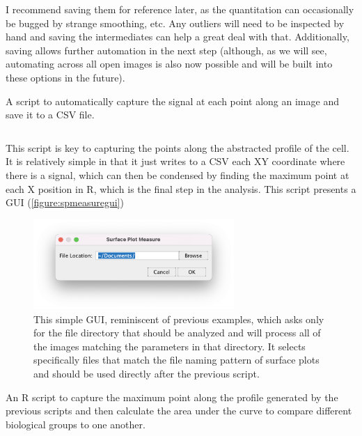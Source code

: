 I recommend saving them for reference later, as the quantitation can occasionally be bugged by strange smoothing, etc. Any outliers will need to be inspected by hand and saving the intermediates can help a great deal with that. Additionally, saving allows further automation in the next step (although, as we will see, automating across all open images is also now possible and will be built into these options in the future).

\begin{code}
\caption{A script to automatically capture the signal at each point along an image and save it to a CSV file.}
\label{surfaceplot}

\inputminted[breaklines,frame=single,fontsize=\small]{python}{source/autoSurfacePlotMeasure.py}

\end{code}

This script is key to capturing the points along the abstracted profile of the cell. It is relatively simple in that it just writes to a CSV each XY coordinate where there is a signal, which can then be condensed by finding the maximum point at each X position in R, which is the final step in the analysis. This script presents a GUI (\autoref{figure:spmeasuregui})

\begin{figure}
\centering
\includegraphics[width=3in]{images/spmeasuregui.png}
\caption{This simple GUI, reminiscent of previous examples, which asks only for the file directory that should be analyzed and will process all of the images matching the parameters in that directory. It selects specifically files that match the file naming pattern of surface plots and should be used directly after the previous script.}
\label{figure:spmeasuregui}
\end{figure}

\begin{code}
\caption{An R script to capture the maximum point along the profile generated by the previous scripts and then calculate the area under the curve to compare different biological groups to one another.}
\label{blinder}

\inputminted[breaklines,frame=single,fontsize=\small]{r}{source/surface_plot_analysis.R}

\end{code}

